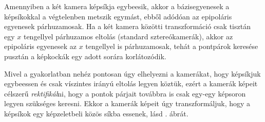 Amennyiben a két kamera képsíkja egybeesik, akkor a bázisegyenesek a képsíkokkal a végtelenben metszik egymást, ebből adódóan az epipoláris egyenesek párhuzamosak. Ha a két kamera közötti transzformáció csak tisztán egy $x$ tengellyel párhuzamos eltolás (standard sztereókamerák), akkor az epipoláris egyenesek az $x$ tengellyel is párhuzamosak, tehát a pontpárok keresése pusztán a képkockák egy adott sorára korlátozódik.

Mivel a gyakorlatban nehéz pontosan úgy elhelyezni a kamerákat, hogy képsíkjuk egybeessen és csak víszintes irányú eltolás legyen köztük, ezért a kamerák képeit célszerű \textit{rektifikál}ni, hogy a pontok párjait továbbra is csak egy-egy képsoron legyen szükséges keresni. Ekkor a kamerák képeit úgy transzformáljuk, hogy a képsíkok egy képzeletbeli közös síkba essenek, lásd . ábrát.

